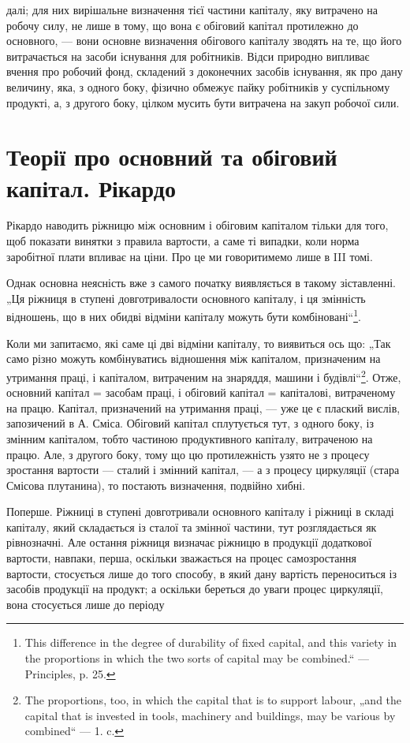 \parcont{}  %
далі; для них вирішальне визначення тієї частини капіталу, яку витрачено
на робочу силу, не лише в тому, що вона є обіговий капітал протилежно
до основного, — вони основне визначення обігового капіталу зводять
на те, що його витрачається на засоби існування для робітників.
Відси природно випливає вчення про робочий фонд, складений з доконечних
засобів існування, як про дану величину, яка, з одного боку,
фізично обмежує пайку робітників у суспільному продукті, а, з другого
боку, цілком мусить бути витрачена на закуп робочої сили.

\section{Теорії про основний та обіговий капітал. Рікардо}

Рікардо наводить ріжницю між основним і обіговим капіталом тільки
для того, щоб показати винятки з правила вартости, а саме ті випадки,
коли норма заробітної плати впливає на ціни. Про це ми говоритимемо
лише в III томі.

Однак основна неясність вже з самого початку виявляється в такому
зіставленні. „Ця ріжниця в ступені довготривалости основного капіталу,
і ця змінність відношень, що в них обидві відміни капіталу можуть бути
комбіновані“\footnote{
This difference in the degree of durability of fixed capital, and this variety
in the proportions in which the two sorts of capital may be combined.“ — Principles,
p. 25.
}.

Коли ми запитаємо, які саме ці дві відміни капіталу, то виявиться ось
що: „Так само різно можуть комбінуватись відношення між капіталом,
призначеним на утримання праці, і капіталом, витраченим на знаряддя,
машини і будівлі“\footnote{
The proportions, too, in which the capital that is to support labour, „and the
capital that is invested in tools, machinery and buildings, may be various by combined“
— 1. c.
}. Отже, основний капітал = засобам праці, і обіговий
капітал = капіталові, витраченому на працю. Капітал, призначений на
утримання праці, — уже це є плаский вислів, запозичений в А. Сміса.
Обіговий капітал сплутується тут, з одного боку, із змінним капіталом,
тобто частиною продуктивного капіталу, витраченою на працю. Але,
з другого боку, тому що цю протилежність узято не з процесу зростання
вартости — сталий і змінний капітал, — а з процесу циркуляції (стара Смісова
плутанина), то постають визначення, подвійно хибні.

Поперше. Ріжниці в ступені довготривали основного капіталу і
ріжниці в складі капіталу, який складається із сталої та змінної частини,
тут розглядається як рівнозначні. Але остання ріжниця визначає ріжницю
в продукції додаткової вартости, навпаки, перша, оскільки зважається на
процес самозростання вартости, стосується лише до того способу, в який
дану вартість переноситься із засобів продукції на продукт; а оскільки
береться до уваги процес циркуляції, вона стосується лише до періоду
\parbreak{}  %
